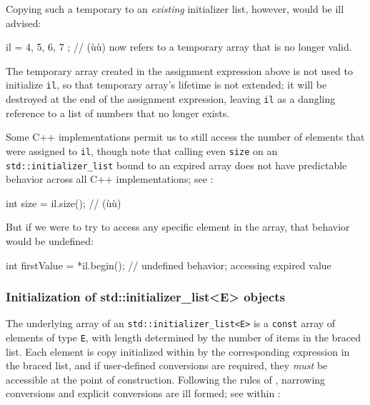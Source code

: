 Copying such a temporary to an \emph{existing} initializer list,
however, would be ill advised:

\begin{emcppslisting}
il = { 4, 5, 6, 7 };  // (ù{}ù) now refers to a temporary array that is no longer valid.
\end{emcppslisting}
    

\noindent The temporary array created in the assignment expression above is not
used to initialize \lstinline!il!, so that temporary array's lifetime is
not extended; it will be destroyed at the end of the assignment
expression, leaving \lstinline!il! as a dangling reference to a list of
numbers that no longer exists.

Some C++ implementations permit us to still access the number of
elements that were assigned to \lstinline!il!, though note that calling
even \lstinline!size! on an \lstinline!std::initializer_list! bound to an
expired array does not have predictable behavior across all C++
implementations; see :

\begin{emcppslisting}
int size = il.size();  // (ù{}ù)
\end{emcppslisting}
    

\noindent But if we were to try to access any specific element in the array, that
behavior would be undefined:

\begin{emcppslisting}
int firstValue = *il.begin();  // undefined behavior; accessing expired value
\end{emcppslisting}
    

\subsubsection[Initialization of \lstinline!std::initializer_list<E>! objects]{Initialization of {\SubsubsecCode std::initializer\_list<E>} objects}\label{initialization-of-std::initializer_list<e>-objects}


The underlying array of an \lstinline!std::initializer_list<E>! is a
\lstinline!const! array of elements of type \lstinline!E!, with length
determined by the number of items in the braced list. Each element is
copy initialized  within  
 by the corresponding expression in the braced list,
and if user-defined conversions are required, they \emph{must} be
accessible at the point of construction. Following the rules of
, narrowing conversions and
explicit conversions are ill formed; see  within :

